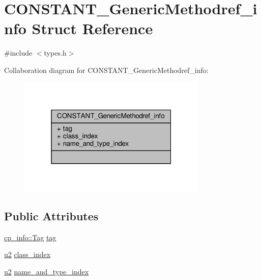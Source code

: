 \hypertarget{structCONSTANT__GenericMethodref__info}{}\section{C\+O\+N\+S\+T\+A\+N\+T\+\_\+\+Generic\+Methodref\+\_\+info Struct Reference}
\label{structCONSTANT__GenericMethodref__info}


{\ttfamily \#include $<$types.\+h$>$}



Collaboration diagram for C\+O\+N\+S\+T\+A\+N\+T\+\_\+\+Generic\+Methodref\+\_\+info\+:\nopagebreak
\begin{figure}[H]
\begin{center}
\leavevmode
\includegraphics[width=256pt]{structCONSTANT__GenericMethodref__info__coll__graph}
\end{center}
\end{figure}
\subsection*{Public Attributes}
\begin{DoxyCompactItemize}
\item 
\hyperlink{structcp__info_acdef8472ed83e12e3a87bca8d6001f69}{cp\+\_\+info\+::\+Tag} \hyperlink{structCONSTANT__GenericMethodref__info_a9ba37a62a4418aa2afd1a93dee802341}{tag}
\item 
\hyperlink{types_8h_ae676e9207f57fb921dca7366b2f59c53}{u2} \hyperlink{structCONSTANT__GenericMethodref__info_af40ffb3f5d052ba62448993bfecf4c80}{class\+\_\+index}
\item 
\hyperlink{types_8h_ae676e9207f57fb921dca7366b2f59c53}{u2} \hyperlink{structCONSTANT__GenericMethodref__info_ab0405302668c160ef2daa7894d33fb33}{name\+\_\+and\+\_\+type\+\_\+index}
\end{DoxyCompactItemize}


